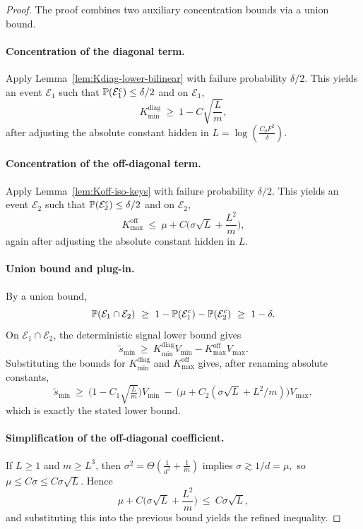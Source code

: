 \begin{proof} The proof combines two auxiliary concentration bounds via a union bound.
\paragraph{Concentration of the diagonal term.}
Apply Lemma~\ref{lem:Kdiag-lower-bilinear} with failure probability $\delta/2$.
This yields an event $\mathcal{E}_{1}$ such that $\mathbb{P}(\mathcal{E}_{1}^c)\le \delta/2$ and on $\mathcal{E}_{1}$,
\[
K_{\min}^{\mathrm{diag}}\ \ge\ 1-C\sqrt{\frac{L}{m}},
\]
after adjusting the absolute constant hidden in $L=\log(\tfrac{C_{0} F^2}{\delta})$.

\paragraph{Concentration of the off-diagonal term.}
Apply Lemma~\ref{lem:Koff-iso-keys} with failure probability $\delta/2$.
This yields an event $\mathcal{E}_{2}$ such that $\mathbb{P}(\mathcal{E}_{2}^c)\le \delta/2$ and on $\mathcal{E}_{2}$,
\[
K_{\max}^{\mathrm{off}}\ \le\ \mu+C\Big(\sigma\sqrt{L}+\frac{L^2}{m}\Big),
\]
again after adjusting the absolute constant hidden in $L$.

\paragraph{Union bound and plug-in.}
By a union bound,
\[
\Pbb(\mathcal{E}_{1}\cap\mathcal{E}_{2})\ \ge\ 1-\Pbb(\mathcal{E}_{1}^c)-\Pbb(\mathcal{E}_{2}^c)\ \ge\ 1-\delta.
\]
On $\mathcal{E}_{1}\cap\mathcal{E}_{2}$, the deterministic signal lower bound gives
\[
\widetilde{s}_{\min}\ \ge\ K_{\min}^{\mathrm{diag}}V_{\min}-K_{\max}^{\mathrm{off}}V_{\max}.
\]
Substituting the bounds for $K_{\min}^{\mathrm{diag}}$ and $K_{\max}^{\mathrm{off}}$ gives, after renaming absolute constants,
\[
\widetilde{s}_{\min}
\ \ge\
\Big(1-C_{1}\sqrt{\tfrac{L}{m}}\Big)V_{\min}
\ -\
\Big(\mu+C_{2}(\sigma\sqrt{L}+L^2/m)\Big)V_{\max},
\]
which is exactly the stated lower bound.

\paragraph{Simplification of the off-diagonal coefficient.}
If \(L\ge 1\) and $m \geq L^3$, then
\(
\sigma^2=\Theta(\tfrac{1}{d^2}+\tfrac{1}{m})
\)
implies
\(
\sigma\gtrsim 1/d=\mu,
\)
so
\(
\mu\le C\sigma\le C\sigma\sqrt{L}.
\)
Hence
\[
\mu+C\Big(\sigma\sqrt{L}+\frac{L^2}{m}\Big)\ \le\ C\sigma\sqrt{L},
\]
and substituting this into the previous bound yields the refined inequality.
\end{proof}


